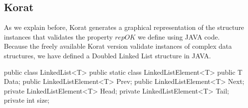 \documentclass[10pt, conference, compsocconf]{IEEEtran}
\begin{document}
%
%
%
%
%
%

\subsection{Korat}
As we explain before, Korat generates a graphical representation of the structure instances that validates the property $repOK$ we define using JAVA code.\\
Because the freely available Korat version validate instances of complex data structures, we have defined a Doubled Linked List structure in JAVA.

\begin{code}
public class LinkedList<T> {
  public static class LinkedListElement<T> {
    public T Data;
    public LinkedListElement<T> Prev;
    public LinkedListElement<T> Next;
  }
  private LinkedListElement<T> Head;
  private LinkedListElement<T> Tail;
  private int size; 
}
\end{code}
\end{document}
